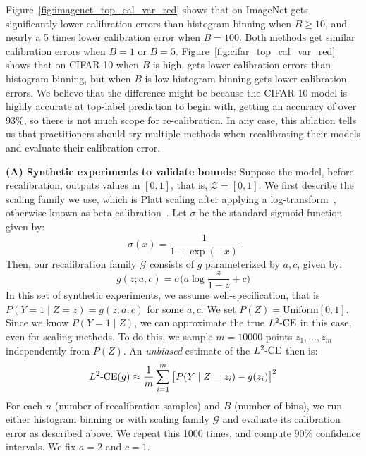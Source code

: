 Figure~\ref{fig:imagenet_top_cal_var_red} shows that on ImageNet \ourcal{} gets significantly lower calibration errors than histogram binning when $B \geq 10$, and nearly a 5 times lower calibration error when $B = 100$. Both methods get similar calibration errors when $B = 1$ or $B = 5$. Figure~\ref{fig:cifar_top_cal_var_red} shows that on CIFAR-10 when $B$ is high, \ourcal{} gets lower calibration errors than histogram binning, but when $B$ is low histogram binning gets lower calibration errors. We believe that the difference might be because the CIFAR-10 model is highly accurate at top-label prediction to begin with, getting an accuracy of over $93\%$, so there is not much scope for re-calibration. In any case, this ablation tells us that practitioners should try multiple methods when recalibrating their models and evaluate their calibration error.

\textbf{(A) Synthetic experiments to validate bounds}: Suppose the model, before recalibration, outputs values in $[0, 1]$, that is, $\mathcal{Z} = [0, 1]$. We first describe the scaling family we use, which is Platt scaling after applying a log-transform~\cite{platt1999probabilistic}, otherwise known as beta calibration~\cite{kull2017sigmoids}. Let $\sigma$ be the standard sigmoid function given by:
\[ \sigma(x) = \frac{1}{1 + \exp(-x)} \]
Then, our recalibration family $\mathcal{G}$ consists of $g$ parameterized by $a, c$, given by:
\[ g(z; a, c) = \sigma\Big( a\log{\frac{z}{1-z}} + c \Big) \]
In this set of synthetic experiments, we assume well-specification, that is $P(Y = 1 \mid Z=z) = g(z; a, c)$ for some $a, c$. We set $P(Z) = \mbox{Uniform}[0, 1]$. Since we know $P(Y = 1 \mid Z)$, we can approximate the true $L^2\textup{-CE}$ in this case, even for scaling methods. To do this, we sample $m=10000$ points $z_1, \dots, z_m$ independently from $P(Z)$. An \emph{unbiased} estimate of the $L^2\textup{-CE}$ then is:
\[ L^2\textup{-CE}(g) \approx \frac{1}{m} \sum_{i=1}^m \big[P(Y \mid Z = z_i) - g(z_i)\big]^2 \]
For each $n$ (number of recalibration samples) and $B$ (number of bins), we run either histogram binning or \ourcal{} with scaling family $\mathcal{G}$ and evaluate its calibration error as described above. We repeat this 1000 times, and compute 90\% confidence intervals. We fix $a = 2$ and $c = 1$.

